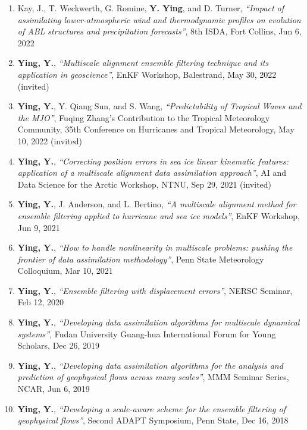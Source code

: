 \begin{enumerate}
\item Kay, J., T. Weckwerth, G. Romine, \textbf{Y. Ying}, and D. Turner, \textit{``Impact of assimilating lower‐atmospheric wind and thermodynamic profiles on evolution of ABL structures and precipitation forecasts''}, 8th ISDA, Fort Collins, Jun 6, 2022

\item \textbf{Ying, Y.}, \textit{``Multiscale alignment ensemble filtering technique and its application in geoscience''}, EnKF Workshop, Balestrand, May 30, 2022
(invited)

\item \textbf{Ying, Y.}, Y. Qiang Sun, and S. Wang, \textit{``Predictability of Tropical Waves and the MJO''}, Fuqing Zhang’s Contribution to the Tropical Meteorology Community, 35th Conference on Hurricanes and Tropical Meteorology, May 10, 2022
(invited)

\item \textbf{Ying, Y.}, \textit{``Correcting position errors in sea ice linear kinematic features: application of a multiscale alignment data assimilation approach''}, AI and Data Science for the Arctic Workshop, NTNU, Sep 29, 2021
(invited)

\item \textbf{Ying, Y.}, J. Anderson, and L. Bertino, \textit{``A multiscale alignment method for ensemble filtering applied to hurricane and sea ice models''}, EnKF Workshop, Jun 9, 2021

\item \textbf{Ying, Y.}, \textit{``How to handle nonlinearity in multiscale problems: pushing the frontier of data assimilation methodology''}, Penn State Meteorology Colloquium, Mar 10, 2021

\item \textbf{Ying, Y.}, \textit{``Ensemble filtering with displacement errors''}, NERSC Seminar, Feb 12, 2020

\item \textbf{Ying, Y.}, \textit{``Developing data assimilation algorithms for multiscale dynamical systems''}, Fudan University Guang-hua International Forum for Young Scholars, Dec 26, 2019

\item \textbf{Ying, Y.}, \textit{``Developing data assimilation algorithms for the analysis and prediction of geophysical flows across many scales''}, MMM Seminar Series, NCAR, Jun 6, 2019

\item \textbf{Ying, Y.}, \textit{``Developing a scale-aware scheme for the ensemble filtering of geophysical flows''}, Second ADAPT Symposium, Penn State, Dec 16, 2018


\end{enumerate}
